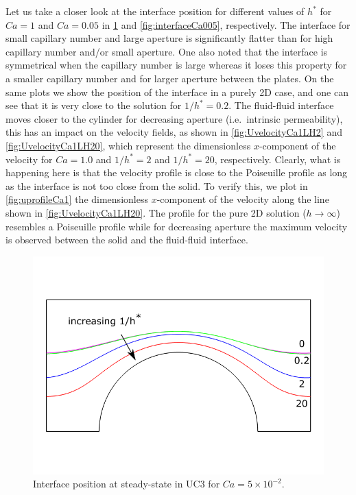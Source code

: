 \documentclass[]{article}
\begin{document}
Let us take a closer look at the interface position for different values
of \(h^*\) for \(Ca=1\) and \(Ca=0.05\) in \cref{fig:interfaceCa1} and
\cref{fig:interfaceCa005}, respectively. The interface for small
capillary number and large aperture is significantly flatter than for
high capillary number and/or small aperture. One also noted that the
interface is symmetrical when the capillary number is large whereas it
loses this property for a smaller capillary number and for larger
aperture between the plates. On the same plots we show the position of
the interface in a purely 2D case, and one can see that it is very close
to the solution for \(1/h^*=0.2\). The fluid-fluid interface moves
closer to the cylinder for decreasing aperture (i.e.~intrinsic
permeability), this has an impact on the velocity fields, as shown in
\cref{fig:UvelocityCa1LH2} and \cref{fig:UvelocityCa1LH20}, which
represent the dimensionless \(x\)-component of the velocity for
\(Ca=1.0\) and \(1/h^*=2\) and \(1/h^*=20\), respectively. Clearly, what
is happening here is that the velocity profile is close to the
Poiseuille profile as long as the interface is not too close from the
solid. To verify this, we plot in \cref{fig:uprofileCa1} the
dimensionless \(x\)-component of the velocity along the line shown in
\cref{fig:UvelocityCa1LH20}. The profile for the pure 2D solution
(\(h\rightarrow\infty\)) resembles a Poiseuille profile while for
decreasing aperture the maximum velocity is observed between the solid
and the fluid-fluid interface.

\begin{figure}
\hypertarget{fig:interfaceCa1}{%
\centering
\includegraphics{figures/pdf/interfaceCa1.pdf}
\caption{Interface position at steady-state in UC3 for
\(Ca=5\times10^{-2}\).}\label{fig:interfaceCa1}
}
\end{figure}
\end{document}
